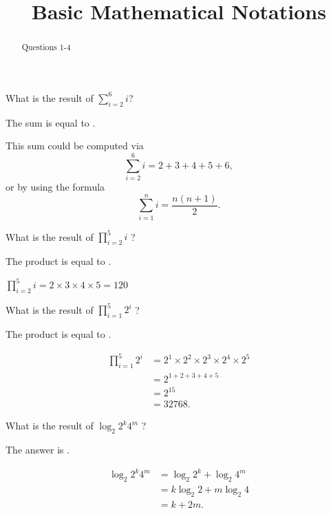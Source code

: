 \documentclass{ximera}
\title{Basic Mathematical Notations}
\begin{document}
\begin{abstract}
Questions 1-4
\end{abstract}

\maketitle

\begin{question}
What is the result of $\sum_{i=2}^6 i$?
\begin{solution}
The sum is equal to .
\end{solution}
This sum could be computed via
\[
\sum_{i=2}^6 i = 2 + 3 + 4 + 5 + 6,
\]
or by using the formula
\[
\sum_{i=1}^n i = \frac{n(n+1)}{2}.
\]
\end{question}

\begin{question}
What is  the result of $\prod_{i=2}^{5} i$ ? 
\begin{solution}
The product is equal to .
\end{solution}
$\prod_{i=2}^5 i = 2 \times 3 \times 4 \times 5 = 120$
\end{question}

\begin{question}
What is  the result of  $\prod_{i=1}^5 2^i$  ? 
\begin{solution}
The product is equal to .
\end{solution}
\begin{align*}
\prod_{i=1}^5 2^i &= 2^1 \times 2^2 \times 2^3 \times 2^4 \times 2^5 \\
&= 2^{1 + 2 + 3 + 4 + 5} \\
&= 2^{15} \\
&= 32768. 
\end{align*}
\end{question}

\begin{question}
What is  the result of  $\log_2 2^k 4^m$  ? 
\begin{solution}
The answer is .
\end{solution}
\begin{align*}
\log_2{2^k 4^m} &= \log_2{2^k} + \log_2{4^m} \\
&= k \log_2{2} + m \log_2{4} \\
&= k + 2m.
\end{align*}
\end{question}
\end{document}
